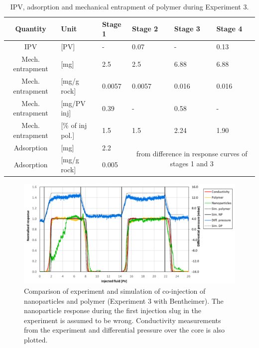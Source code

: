 \documentclass[nanomaterials,article,submit,moreauthors,pdftex]{Definitions/mdpi}
\begin{document}
\begin{table}[h!]
\small
\centering
\caption{IPV, adsorption and mechanical entrapment of polymer during Experiment 3.}
\label{tab:ipvexp3pol}
\begin{tabular}{c l l l l l } 
\toprule
\textbf{Quantity} & \textbf{Unit} & \textbf{Stage 1} & \textbf{Stage 2} & \textbf{Stage 3} & \textbf{Stage 4} \\ 
\midrule 
IPV                & [PV]           & -         & 0.07     & -         & 0.13     \\
Mech. entrapment   & [mg]          & 2.5       & 2.5      & 6.88       & 6.88       \\ 
Mech. entrapment   & [mg/g rock]   & 0.0057   & 0.0057     & 0.016     & 0.016     \\ 
Mech. entrapment   & [mg/PV inj]   & 0.39      & -         & 0.58      & -         \\
Mech. entrapment   & [\% of inj pol.]& 1.5       & 1.5       & 2.24       & 1.90       \\ 
Adsorption         & [mg]          & 2.2      &   \multicolumn{3}{c}{\multirow{2}{15em}{from difference in response curves of stages 1 and 3}}        \\
Adsorption         & [mg/g rock]   & 0.005      &  \multicolumn{3}{c}{}    \\ 
\bottomrule
\end{tabular}
\end{table}

\begin{figure}[h!]
    \centering
    \includegraphics[width=.8\textwidth]{fig/simExpNP3.png}
    \caption{Comparison of experiment and simulation of co-injection of nanoparticles and polymer (Experiment 3 with Bentheimer). The nanoparticle response during the first injection slug in the experiment is assumed to be wrong. Conductivity measurements from the experiment and differential pressure over the core is also plotted.}
    \label{cht:simExpNP3}
\end{figure}
\end{document}

